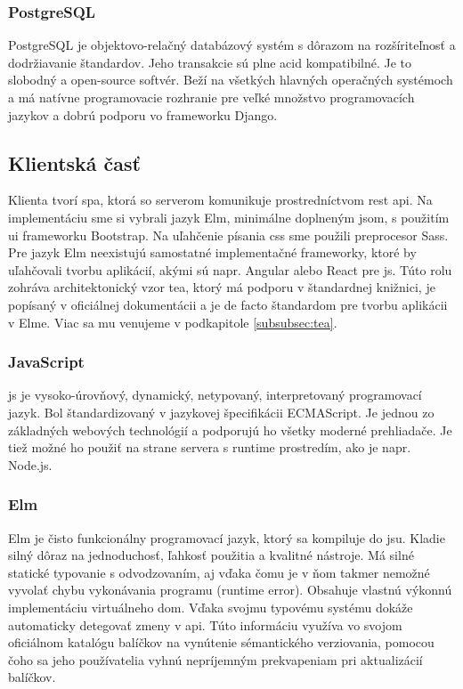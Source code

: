 \subsubsection{PostgreSQL}

PostgreSQL je objektovo-relačný databázový systém s dôrazom na rozšíriteľnosť a
dodržiavanie štandardov. Jeho transakcie sú plne \acrshort{acid} kompatibilné.
Je to slobodný a open-source softvér. Beží na všetkých hlavných operačných
systémoch a má natívne programovacie rozhranie pre veľké množstvo programovacích
jazykov a dobrú podporu vo frameworku Django. \cite{postgresql}

\subsection{Klientská časť}
\label{subsec:front_end}

Klienta tvorí \acrshort{spa}, ktorá so serverom komunikuje prostredníctvom
\acrshort{rest} \acrshort{api}. Na implementáciu sme si vybrali jazyk Elm,
minimálne doplneným \acrlong{js}om, s použitím \acrshort{ui} frameworku
Bootstrap. Na uľahčenie písania \acrshort{css} sme použili preprocesor Sass. Pre
jazyk Elm neexistujú samostatné implementačné frameworky, ktoré by uľahčovali
tvorbu aplikácií, akými sú napr. Angular alebo React pre \acrshort{js}. Túto
rolu zohráva architektonický vzor \acrfull{tea}, ktorý má podporu v štandardnej
knižnici, je popísaný v oficiálnej dokumentácii a je de facto štandardom pre
tvorbu aplikácii v Elme. Viac sa mu venujeme v podkapitole \ref{subsubsec:tea}.

\subsubsection{JavaScript}

\acrfull{js} je vysoko-úrovňový, dynamický, netypovaný, interpretovaný
programovací jazyk. Bol štandardizovaný v jazykovej špecifikácii ECMAScript. Je
jednou zo základných webových technológií a podporujú ho všetky moderné
prehliadače. \cite{flanagan} Je tiež možné ho použiť na strane servera s runtime
prostredím, ako je napr. Node.js.

\subsubsection{Elm}

Elm je čisto funkcionálny programovací jazyk, ktorý sa kompiluje do
\acrlong{js}u. Kladie silný dôraz na jednoduchosť, ľahkosť použitia a kvalitné
nástroje. Má silné statické typovanie s odvodzovaním, aj vďaka čomu je v ňom
takmer nemožné vyvolať chybu vykonávania programu (runtime error). Obsahuje
vlastnú výkonnú implementáciu virtuálneho \acrshort{dom}. Vďaka svojmu typovému
systému dokáže automaticky detegovať zmeny v \acrshort{api}. Túto informáciu
využíva vo svojom oficiálnom katalógu balíčkov na vynútenie sémantického
verziovania, pomocou čoho sa jeho používatelia vyhnú nepríjemným prekvapeniam
pri aktualizácií balíčkov. \cite{elm}

